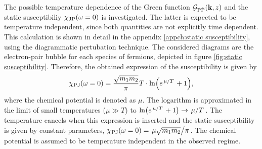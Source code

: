 The possible temperature dependence of the Green function $\mathcal{G}_{\dot{\mathrm{P}}\dot{\mathrm{P}}}(\vb{k}, z)$ and the static susceptibiliy $\chi_{\mathrm{JP}}(\omega = 0)$ is investigated.
The latter is expected to be temperature independent, since both quantities are not explicitly time dependent. 
This calculation is shown in detail in the appendix \ref{appch:static susceptibility}, using the diagrammatic pertubation technique.
The considered diagrams are the electron-pair bubble for each species of fermions, depicted in figure \ref{fig:static susceptibility}.
Therefore, the obtained expression of the susceptibility is given by
%
\begin{align}
	\chi_{\mt{PJ}}(\omega = 0) = \frac{\sqrt{m_{1} m_{2}}}{\pi} T \cdot \ln(e^{\flatfrac{\mu}{T}} + 1),
	\label{eq:static susceptibility computed}
\end{align}
%
where the chemical potential is denoted as $\mu$.
The logarithm is approximated in the limit of small temperatures ($\mu \gg T$) to $\ln(e^{\flatfrac{\mu}{T}} + 1) \rightarrow \flatfrac{\mu}{T}$.
The temperature cancels when this expression is inserted and the static susceptibility is given by constant parameters, $\chi_{\mt{PJ}}(\omega = 0) = \flatfrac{\mu\sqrt{m_{1} m_{2}}}{\pi}$.
The chemical potential is assumed to be temperature independent in the observed regime.

